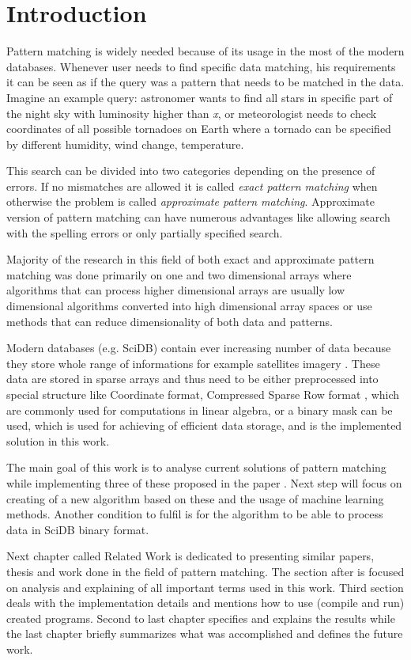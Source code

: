 
\chapter{Introduction}
Pattern matching is widely needed because of its usage in the most of the modern databases. Whenever user needs to find specific data matching, his requirements it can be seen as if the query was a pattern that needs to be matched in the data. Imagine an example query: astronomer wants to find all stars in specific part of the night sky with luminosity higher than \textit{x}, or meteorologist needs to check coordinates of all possible tornadoes on Earth where a tornado can be specified by different humidity, wind change, temperature. \cite{detectRivers}

This search can be divided into two categories depending on the presence of errors. If no mismatches are allowed it is called \textit{exact pattern matching} when otherwise the problem is called \textit{approximate pattern matching}. Approximate version of pattern matching can have numerous advantages like allowing search with the spelling errors or only partially specified search. 

Majority of the research in this field of both exact and approximate pattern matching was done primarily on one and two dimensional arrays where algorithms that can process higher dimensional arrays are usually low dimensional algorithms converted into high dimensional array spaces or use methods that can reduce dimensionality of both data and patterns.

Modern databases (e.g. SciDB) contain ever increasing number of data because they store whole range of informations for example satellites imagery \cite{scidbarch}. These data are stored in sparse arrays and thus need to be either preprocessed into special structure like Coordinate format, Compressed Sparse Row format \cite{saad1990sparskit}, which are commonly used for computations in linear algebra, or a binary mask can be used, which is used for achieving of efficient data storage, and is the implemented solution in this work.

The main goal of this work is to analyse current solutions of pattern matching while implementing three of these proposed in the paper \cite{mdApproxPM}. Next step will focus on creating of a new algorithm based on these and the usage of machine learning methods. Another condition to fulfil is for the algorithm to be able to process data in SciDB binary format. 

Next chapter called Related Work is dedicated to presenting similar papers, thesis and work done in the field of pattern matching. The section after is focused on analysis and explaining of all important terms used in this work. Third section deals with the implementation details and mentions how to use (compile and run) created programs. Second to last chapter specifies and explains the results while the last chapter briefly summarizes what was accomplished and defines the future work.

